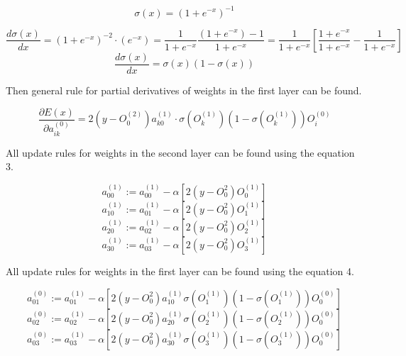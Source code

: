 \documentclass[12pt,a4paper, margin=1in]{article}
\begin{document}
\begin{equation*}
    \sigma (x) = (1 + e^{-x})^{-1}
\end{equation*}

\begin{equation*}
    \frac{d\sigma (x)}{dx} = (1 + e^{-x})^{-2}\cdot (e^{-x}) = \frac{1}{1+e^{-x}}\frac{(1+e^{-x}) - 1}{1+e^{-x}} = \frac{1}{1+e^{-x}} \left [  \frac{1+e^{-x}}{1+e^{-x}} - \frac{1}{1+e^{-x}} \right ] 
\end{equation*}
\begin{equation*}
    \frac{d\sigma (x)}{dx} = \sigma (x) (1 - \sigma (x))
\end{equation*}

\bigskip

Then general rule for partial derivatives of weights in the first layer can be found.

\begin{equation}
    \frac{\partial E(x)}{\partial a^{(0)}_{ik}} = 2(y-O^{(2)}_0)a^{(1)}_{k0}\cdot \sigma(O^{(1)}_k)(1-\sigma(O^{(1)}_k))O^{(0)}_i
\end{equation}

\bigskip

All update rules for weights in the second layer can be found using the equation 3.

\begin{equation*}
    a^{(1)}_{00} := a^{(1)}_{00} - \alpha \left [ 2(y - O^{2}_0)O^{(1)}_0 \right ]
\end{equation*}
\begin{equation*}
    a^{(1)}_{10} := a^{(1)}_{01} - \alpha \left [ 2(y - O^{2}_0)O^{(1)}_1 \right ]
\end{equation*}
\begin{equation*}
    a^{(1)}_{20} := a^{(1)}_{02} - \alpha \left [ 2(y - O^{2}_0)O^{(1)}_2 \right ]
\end{equation*}
\begin{equation*}
    a^{(1)}_{30} := a^{(1)}_{03} - \alpha \left [ 2(y - O^{2}_0)O^{(1)}_3 \right ]
\end{equation*}

All update rules for weights in the first layer can be found using the equation 4.

\begin{equation*}
    a^{(0)}_{01} := a^{(1)}_{01} - \alpha \left [ 2(y - O^{2}_0)a^{(1)}_{10} \sigma(O^{(1)}_1)(1-\sigma(O^{(1)}_1)) O^{(0)}_0\right ]
\end{equation*}
\begin{equation*}
    a^{(0)}_{02} := a^{(1)}_{02} - \alpha \left [ 2(y - O^{2}_0)a^{(1)}_{20} \sigma(O^{(1)}_2)(1-\sigma(O^{(1)}_2)) O^{(0)}_0\right ]
\end{equation*}
\begin{equation*}
    a^{(0)}_{03} := a^{(1)}_{03} - \alpha \left [ 2(y - O^{2}_0)a^{(1)}_{30} \sigma(O^{(1)}_3)(1-\sigma(O^{(1)}_3)) O^{(0)}_0\right ]
\end{equation*}
\end{document}
